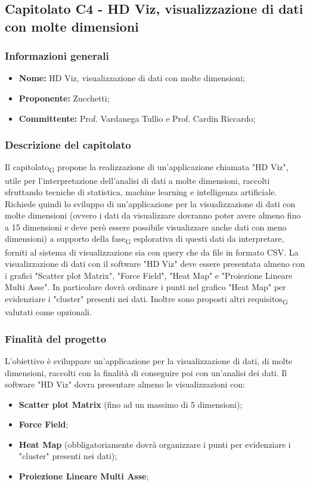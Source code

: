 \subsection{Capitolato C4 - HD Viz, visualizzazione di dati con molte dimensioni}
\subsubsection{Informazioni generali}
	\begin{itemize}
	\item \textbf{Nome:} HD Viz, visualizzazione di dati con molte dimensioni;
	\item \textbf{Proponente:} Zucchetti;
	\item \textbf{Committente:}  Prof. Vardanega Tullio e Prof. Cardin Riccardo;
	\end{itemize}
\subsubsection{Descrizione del capitolato}
Il \gls{capitolato}\textsubscript{G} propone la realizzazione di un'applicazione chiamata "HD Viz", utile per l'interpretazione dell'analisi di dati a molte dimensioni, raccolti sfruttando tecniche di statistica, machine learning e intelligenza artificiale.
Richiede quindi lo sviluppo di un'applicazione per la visualizzazione di dati con molte dimensioni (ovvero i dati da visualizzare dovranno poter avere almeno fino a 15 dimensioni e deve però essere possibile visualizzare anche dati con meno dimensioni) a supporto della \gls{fase}\textsubscript{G} esplorativa di questi dati da interpretare, forniti al sistema di visualizzazione sia con query che da file in formato CSV.
La visualizzazione di dati con il software "HD Viz" deve essere presentata almeno con i grafici "Scatter plot Matrix", "Force Field", "Heat Map" e "Proiezione Lineare Multi Asse". In particolare dovrà ordinare i punti nel grafico "Heat Map" per evidenziare i "cluster" presenti nei dati.
Inoltre sono proposti altri \glspl{requisito}\textsubscript{G} valutati come opzionali.
\subsubsection{Finalità del progetto}
L'obiettivo è sviluppare un'applicazione per la visualizzazione di dati, di molte dimensioni, raccolti con la finalità di conseguire poi con un'analisi dei dati.
Il software "HD Viz" dovra presentare almeno le visualizzazioni con:
\begin{itemize}
\item \textbf{Scatter plot Matrix} (fino ad un massimo di 5 dimensioni);
\item \textbf{Force Field};
\item \textbf{Heat Map} (obbligatoriamente dovrà organizzare i punti per evidenziare i "cluster" presenti nei dati);
\item \textbf{Proiezione Lineare Multi Asse};
\end{itemize}
